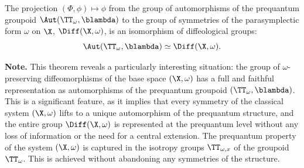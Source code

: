 \begin{article}
    \begin{theorem}{}
      The projection $(\Phi,\phi) \mapsto \phi$ from the group of automorphisms of the prequantum groupoid $\Aut(\TT_\omega,\blambda)$ to the group of symmetries of the parasymplectic form $\omega$ on $\X$,
      $\Diff(\X,\omega)$,
      is an isomorphism of diffeological groups:
      $$
        \Aut(\TT_\omega, \blambda) \simeq \Diff(\X,\omega).
        $$
    \end{theorem}
    
    \textbf{Note.} This theorem reveals a particularly interesting situation:
    the group of $\omega$-preserving diffeomorphisms of the base space $(\X, \omega)$ has a full and faithful representation as automorphisms of the prequantum groupoid $(\TT_\omega, \blambda)$.
    This is a significant feature,
    as it implies that every symmetry of the classical system $(\X, \omega)$ lifts to a unique automorphism of the prequantum structure,
    and the entire group $\Diff(\X, \omega)$ is represented at the prequantum level without any loss of information or the need for a central extension.
    The prequantum property of the system $(\X,\omega)$ is captured in the isotropy groups $\TT_{\omega,x}$ of the groupoid $\TT_\omega$.
    This is achieved without abandoning any symmetries of the structure.
    
  \end{article}
  
